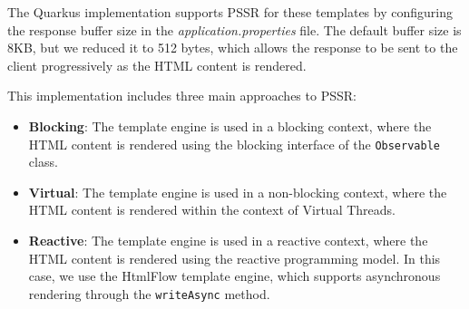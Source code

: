 The Quarkus implementation supports PSSR for these templates by configuring the
response buffer size in the \textit{application.properties} file. The default
buffer size is 8KB, but we reduced it to 512 bytes, which allows the response
to be sent to the client progressively as the HTML content is rendered.

This implementation includes three main approaches to PSSR\@:
\begin{itemize}
      \item \textbf{Blocking}: The template engine is used in a blocking context,
            where the HTML content is rendered using the blocking interface of the
            \texttt{Observable} class.
      \item \textbf{Virtual}: The template engine is used in a non-blocking context,
            where the HTML content is rendered within the context of Virtual Threads.
      \item \textbf{Reactive}: The template engine is used in a reactive context,
            where the HTML content is rendered using the reactive programming model.
            In this case, we use the HtmlFlow template engine, which
            supports asynchronous rendering through the \texttt{writeAsync} method.
\end{itemize}